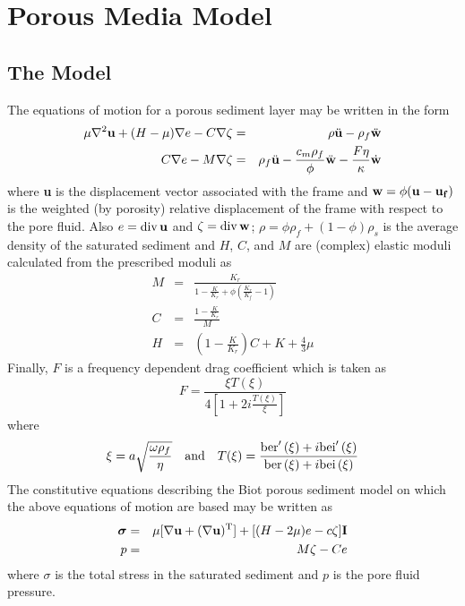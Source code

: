 \appendix

\section{Porous Media Model}
\label{app_biot}

\subsection*{The Model}

The equations of motion for a porous sediment layer may be written in
the form\cite{stern}
\begin{eqnarray*}
\mu \nabla^2 {\bf u} + (H - \mu) \nabla e - C
\nabla \zeta & = & \rho \ddot{\bf u} - \rho_f \ddot{\bf w}
\\
 C \nabla e - M \nabla \zeta & = & \rho_f
\ddot{\bf u} - \frac{c_m \rho_f}{\phi} \ddot{\bf w} - \frac{F
\eta}{\kappa} \dot{\bf w}
\end{eqnarray*}
where  {\bf u}  is the displacement vector associated with the frame
and  ${\bf w} = \phi ( {\bf u} - {\bf u_f} )$ is the weighted (by
porosity) relative displacement of the frame with respect to the pore
fluid.  Also  $e = {\rm div\,} {\bf u}$ and $\zeta = {\rm div\,}{\bf
w}$;
$\rho = \phi \rho_f + (1 - \phi )\rho_s$ is the average density of the
saturated sediment  and  $H$, $C$, and $M$ are (complex) elastic moduli
calculated from the prescribed moduli as
\begin{eqnarray*}
M & = & \frac{K_r}{1 - \frac{K}{K_r} + \phi ( \frac{K_r}{K_f} - 1 )} \\
C & = & \frac{1 - \frac{K}{K_r}}{M} \\
H & = & (1 - \frac{K}{K_r} ) C + K + \frac{4}{3}\mu
\end{eqnarray*}
Finally, $F$ is a frequency dependent drag coefficient which is taken
as\cite{biot}
\[
F = \frac{\xi T ( \xi )}{4 [ 1 + 2 i \frac{T ( \xi )}{\xi} ]}\]
where
\[\xi = a \sqrt{\frac{\omega \rho_f}{\eta}}{~~~\rm and ~~~}
T ( \xi ) = \frac{{\rm ber}'\,(\xi) + i \/ {\rm bei}'\,(\xi)}
{{\rm ber}\,(\xi) + i \/ {\rm bei}\,(\xi)}
\]
The constitutive equations describing the Biot porous sediment model
on which the above equations of motion are based may be written as
\begin{eqnarray*}
{\mbox{\boldmath $\sigma$}} & = & \mu [ \nabla {\bf u} + ( \nabla {\bf
u} )^{\rm T} ] + [(H - 2\mu ) e - c \zeta ] {\rm {\bf I}} \\
p & = & M \zeta - C e
\end{eqnarray*}
where {\mbox{\boldmath $\sigma$}} is the total stress in the saturated
sediment and
$p$  is the pore fluid pressure.

